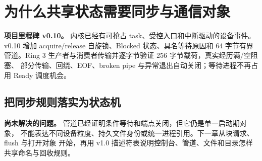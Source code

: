 \chapter{为什么共享状态需要同步与通信对象}

\begin{statebox}
\textbf{项目里程碑 v0.10。} 内核已经有可抢占 task、受控入口和中断驱动的设备事件。
v0.10 增加 acquire/release 自旋锁、Blocked 状态、具名等待原因和 64 字节有界
管道。Ring 3 生产者与消费者传输并逐字节验证 256 字节载荷，真实经历满/空阻塞、
部分传输、回绕、EOF、broken pipe 与异常退出自动关闭；等待进程不再占用 Ready
调度机会。
\end{statebox}



\section{把同步规则落实为状态机}

\begin{problemframe}
\textbf{尚未解决的问题。} 管道已经证明条件等待和端点关闭，但它仍是单一启动期对象，
不能表达不同设备粒度、持久文件身份或统一进程引用。下一章从块请求、flush 与打开对象
开始，再用 v1.0 描述符表说明控制台、管道、文件和目录怎样共享命名与回收规则。
\end{problemframe}
